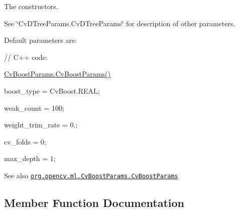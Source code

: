 The constructors.

See \char`\"{}\+Cv\+D\+Tree\+Params.\+Cv\+D\+Tree\+Params\char`\"{} for description of other parameters.

Default parameters are\+:

{\ttfamily }

{\ttfamily }

{\ttfamily }

{\ttfamily // C++ code\+:}

{\ttfamily }

{\ttfamily }

{\ttfamily \mbox{\hyperlink{classorg_1_1opencv_1_1ml_1_1_cv_boost_params_a5b9287c0c9f817592786a0b8009eea76}{Cv\+Boost\+Params.\+Cv\+Boost\+Params()}}}

{\ttfamily }

{\ttfamily }

{\ttfamily boost\+\_\+type = Cv\+Boost.\+R\+E\+AL;}

{\ttfamily }

{\ttfamily }

{\ttfamily weak\+\_\+count = 100;}

{\ttfamily }

{\ttfamily }

{\ttfamily weight\+\_\+trim\+\_\+rate = 0.;}

{\ttfamily }

{\ttfamily }

{\ttfamily cv\+\_\+folds = 0;}

{\ttfamily }

{\ttfamily }

{\ttfamily max\+\_\+depth = 1;}

{\ttfamily }

{\ttfamily \begin{DoxySeeAlso}{See also}
\href{http://docs.opencv.org/modules/ml/doc/boosting.html#cvboostparams-cvboostparams}{\tt org.\+opencv.\+ml.\+Cv\+Boost\+Params.\+Cv\+Boost\+Params} 
\end{DoxySeeAlso}
}

\subsection{Member Function Documentation}
\mbox{\label{classorg_1_1opencv_1_1ml_1_1_cv_boost_params_a93fe028fb7e0923faf605ee8c0ed084b}} 
